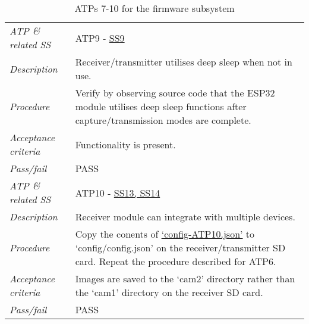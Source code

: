 \documentclass[class=report,11pt,crop=false]{standalone}
\begin{document}
\begin{table}[!ht]
\begin{scriptsize}
\begin{tabularx}{\textwidth}{|p{} X|}
        \textit{ATP \& related SS} & ATP9 - \hyperlink{tab:firmware-requirements}{SS9}\\
        \textit{Description} & Receiver/transmitter utilises deep sleep when not in use.\\
        \textit{Procedure} & Verify by observing source code that the ESP32 module utilises deep sleep functions after capture/transmission modes are complete. \\
        \textit{Acceptance criteria} & Functionality is present.\\ 
        \textit{Pass/fail} & PASS\\ \hline

        \textit{ATP \& related SS} & ATP10 - \hyperlink{tab:firmware-requirements}{SS13, SS14}\\
        \textit{Description} & Receiver module can integrate with multiple devices.\\
        \textit{Procedure} & Copy the conents of \href{https://github.com/rothdu/EEE4113F-Group13-2024/blob/main/firmware/json-samples/config-ATP10.json}{`config-ATP10.json'} to `config/config.json' on the receiver/transmitter SD card. Repeat the procedure described for ATP6. \\
        \textit{Acceptance criteria} & Images are saved to the `cam2' directory rather than the `cam1' directory on the receiver SD card.\\ 
        \textit{Pass/fail} & PASS\\ \hline

    \end{tabularx}
    \end{scriptsize}
    \caption{ATPs 7-10 for the firmware subsystem}
    \label{tab:firmware-atps2}
\end{table}



\end{document}
